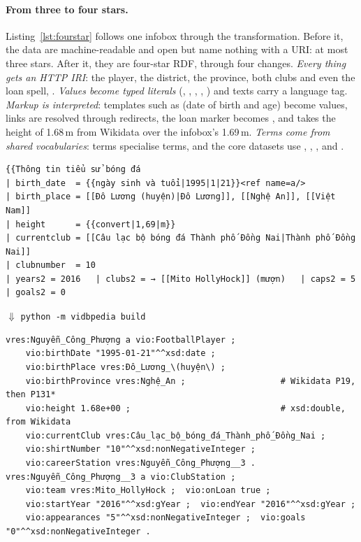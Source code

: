 \paragraph{From three to four stars.} Listing~\ref{lst:fourstar} follows one
infobox through the transformation. Before it, the data are machine-readable and
open but name nothing with a URI: at most three stars. After it, they are four-star RDF, through four changes.
\emph{Every thing gets an HTTP IRI}: the player, the district, the province,
both clubs and even the loan spell, .
\emph{Values become typed literals} (, ,
, , ) and texts
carry a language tag. \emph{Markup is interpreted}: templates such as
 (date of birth and age) become values, links are
resolved through redirects, the loan marker  becomes
, and  takes the height of 1.68\,m from
Wikidata over the infobox's 1.69\,m. \emph{Terms come from shared
vocabularies}:  terms specialise  terms, and the core
datasets use , , ,  and
.
\begin{listing}[t]
\begin{Verbatim}
{{Thông tin tiểu sử bóng đá
| birth_date  = {{ngày sinh và tuổi|1995|1|21}}<ref name=a/>
| birth_place = [[Đô Lương (huyện)|Đô Lương]], [[Nghệ An]], [[Việt Nam]]
| height      = {{convert|1,69|m}}
| currentclub = [[Câu lạc bộ bóng đá Thành phố Đồng Nai|Thành phố Đồng Nai]]
| clubnumber  = 10
| years2 = 2016   | clubs2 = → [[Mito HollyHock]] (mượn)   | caps2 = 5   | goals2 = 0
\end{Verbatim}
\vspace{-0.4em}
\begin{center}\footnotesize $\Downarrow$ \quad \texttt{python -m vidbpedia build}\end{center}
\vspace{-0.6em}
\begin{Verbatim}
vres:Nguyễn_Công_Phượng a vio:FootballPlayer ;
    vio:birthDate "1995-01-21"^^xsd:date ;
    vio:birthPlace vres:Đô_Lương_\(huyện\) ;
    vio:birthProvince vres:Nghệ_An ;                   # Wikidata P19, then P131*
    vio:height 1.68e+00 ;                              # xsd:double, from Wikidata
    vio:currentClub vres:Câu_lạc_bộ_bóng_đá_Thành_phố_Đồng_Nai ;
    vio:shirtNumber "10"^^xsd:nonNegativeInteger ;
    vio:careerStation vres:Nguyễn_Công_Phượng__3 .
vres:Nguyễn_Công_Phượng__3 a vio:ClubStation ;
    vio:team vres:Mito_HollyHock ;  vio:onLoan true ;
    vio:startYear "2016"^^xsd:gYear ;  vio:endYear "2016"^^xsd:gYear ;
    vio:appearances "5"^^xsd:nonNegativeInteger ;  vio:goals "0"^^xsd:nonNegativeInteger .
\end{Verbatim}
\caption{From three to four stars: part of the infobox of Nguyễn Công Phượng
(top, wikitext) and the triples the build produces for it (bottom, Turtle,
excerpt).}
\label{lst:fourstar}
\end{listing}

